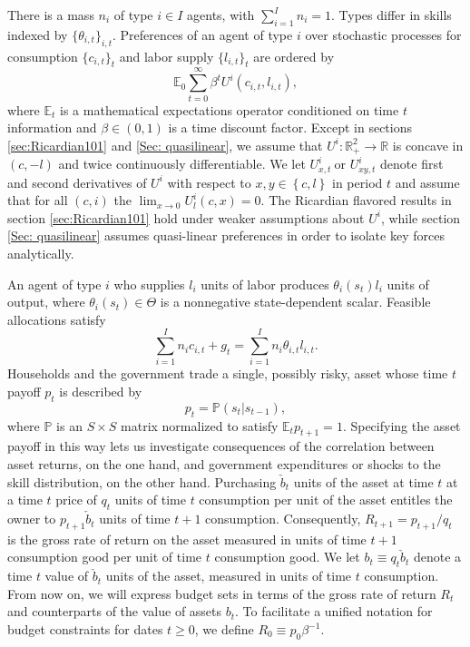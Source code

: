 \documentclass[thmsb,11pt]{article}
\begin{document}
There is a mass $n_{i}$ of type $i\in I$ agents, with $\sum_{i=1}^{I}n_{i}=1.$
Types differ in skills indexed by $\{\theta_{i,t}\}_{i,t}$.
Preferences of an agent of type $i$ over stochastic processes for consumption $\{c_{i,t}\}_{t}$ and labor supply $\{l_{i,t}\}_{t}$
are ordered by
\begin{equation}
\mathbb{E}_{0}\sum_{t=0}^{\infty}\beta^{t}U^{i}\left(c_{i,t},l_{i,t}\right),\label{utility lifetime}
\end{equation}
where $\mathbb{E}_{t}$ is a mathematical expectations operator conditioned on time $t$ information and
$\beta\in\left(0,1\right)$ is a time discount factor.
Except in sections  \ref{sec:Ricardian101} and \ref{Sec: quasilinear}, we assume that $U^{i}:\mathbb{R}%
_{+}^{2}\rightarrow \mathbb{R}$ is concave in $\left( c,-l\right) $ and
twice continuously differentiable. We let $U_{x,t}^{i}\ $or $U_{xy,t}^{i}$
denote first and second derivatives of $U^{i}$ with respect to $x,y\in
\left\{ c,l\right\} $ in period $t$ and assume that for all $(c,i)$ the $\lim_{x\rightarrow
0}U_{l}^{i}\left( c,x\right) =0$. The Ricardian flavored results in section \ref{sec:Ricardian101} hold under weaker assumptions about $U^{i}$,
while section \ref{Sec: quasilinear} assumes quasi-linear preferences in order to isolate key forces analytically.

An agent of type $i$ who supplies $l_{i}$ units of labor produces
$\theta_{i}\left(s_{t}\right)l_{i}$ units of output, where $\theta_{i}(s_{t})\in\Theta$
is a nonnegative state-dependent scalar. Feasible allocations satisfy
\begin{equation}
\label{eqn:feasiblity}
\sum_{i=1}^{I}n_{i}c_{i,t}+g_{t}=\sum_{i=1}^{I}n_{i}\theta_{i,t}l_{i,t}.
\end{equation}
\color{black}
Households and the government  trade a single, possibly risky, asset whose
\color{black}
time $t$ payoff $p_{t}$  is described by
\[
p_{t}=\mathbb{P}(s_{t}|s_{t-1}),
\]
where  $\mathbb{P}$ is an $S\times S$ matrix normalized to satisfy $\mathbb{E}_{t}p_{t+1}=1$.
Specifying the asset payoff in this way lets  us  investigate  consequences  of the correlation between asset returns, on the one hand,
and government expenditures or shocks to the skill distribution,  on the other hand.
Purchasing $\check b_t$ units of the asset at time $t$ at a time $t$ price of $q_t$ units of time $t$ consumption per unit of the asset
entitles the owner to $p_{t+1} \check b_t$ units of time $t+1$ consumption.  Consequently, $R_{t+1} = p_{t+1} / q_t$ is the gross rate of
return on the asset measured in units of time $t+1$ consumption good per unit of time $t$ consumption good.  We let $b_t \equiv q_t \check b_t$ denote
a time $t$ value of $\check b_t$ units of the asset, measured in units of time $t$ consumption.  From now on, we will express
 budget sets in terms of the gross rate of return $R_t$ and  counterparts of the value of assets $b_t$.
To facilitate a unified notation for budget constraints for dates $t \geq 0$, we define $R_0 \equiv p_0 \beta^{-1}$.
\color{black}
\end{document}
